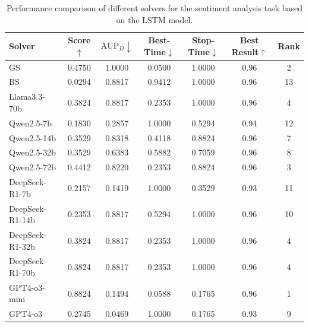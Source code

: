 \begin{table}[h]
    \centering
    \setlength{\tabcolsep}{3pt}
    \renewcommand\arraystretch{1.5}
    \caption{Performance comparison of different solvers for the sentiment analysis task based on the LSTM model.}
    \begin{tabular}{l|cccccc}
    \toprule
    Solver           & Score$\uparrow$ & $\text{AUP}_D\downarrow$ & Best-Time$\downarrow$ & Stop-Time$\downarrow$ & Best Result$\uparrow$ & Rank \\
    \midrule
    GS & 0.4750 & 1.0000 & 0.0500 & 1.0000 & 0.96 & 2 \\
    BS & 0.0294 & 0.8817 & 0.9412 & 1.0000 & 0.96 & 13 \\
    Llama3.3-70b & 0.3824 & 0.8817 & 0.2353 & 1.0000 & 0.96 & 4 \\
    Qwen2.5-7b & 0.1830 & 0.2857 & 1.0000 & 0.5294 & 0.94 & 12 \\
    Qwen2.5-14b & 0.3529 & 0.8318 & 0.4118 & 0.8824 & 0.96 & 7 \\
    Qwen2.5-32b & 0.3529 & 0.6383 & 0.5882 & 0.7059 & 0.96 & 8 \\
    Qwen2.5-72b & 0.4412 & 0.8220 & 0.2353 & 0.8824 & 0.96 & 3 \\
    DeepSeek-R1-7b & 0.2157 & 0.1419 & 1.0000 & 0.3529 & 0.93 & 11 \\
    DeepSeek-R1-14b & 0.2353 & 0.8817 & 0.5294 & 1.0000 & 0.96 & 10 \\
    DeepSeek-R1-32b & 0.3824 & 0.8817 & 0.2353 & 1.0000 & 0.96 & 4 \\
    DeepSeek-R1-70b & 0.3824 & 0.8817 & 0.2353 & 1.0000 & 0.96 & 4 \\
    GPT4-o3-mini & 0.8824 & 0.1494 & 0.0588 & 0.1765 & 0.96 & 1 \\
    GPT4-o3 & 0.2745 & 0.0469 & 1.0000 & 0.1765 & 0.93 & 9 \\
    \bottomrule
    \end{tabular}
    \label{tab:LSTM}
\end{table}

